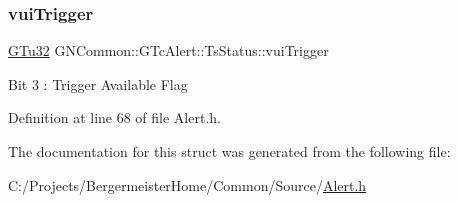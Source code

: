 \subsubsection{\texorpdfstring{vui\+Trigger}{vuiTrigger}}
{\footnotesize\ttfamily \mbox{\hyperlink{namespace_g_n_common_ae5485474bc8f23e462e920a17b377b53}{G\+Tu32}} G\+N\+Common\+::\+G\+Tc\+Alert\+::\+Ts\+Status\+::vui\+Trigger}

Bit 3 \+: Trigger Available Flag 

Definition at line 68 of file Alert.\+h.



The documentation for this struct was generated from the following file\+:\begin{DoxyCompactItemize}
\item 
C\+:/\+Projects/\+Bergermeister\+Home/\+Common/\+Source/\mbox{\hyperlink{_alert_8h}{Alert.\+h}}\end{DoxyCompactItemize}
